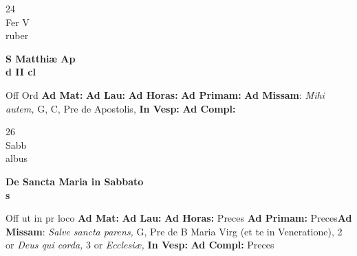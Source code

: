 \documentclass[10pt, openany]{book}
\begin{document}
        \begin{center}
            \begin{minipage}{3.5in}
                \vspace{2em}
                \begin{minipage}{0.5in}
                    {\Huge 24} \\
                    {\normalsize Fer V} \\
                    {\normalsize ruber}
                \end{minipage}
                \begin{minipage}{3.0in}
                    \textbf{ \large S Matthiæ Ap \\
                    \textnormal{\normalsize d II cl}} \\ 
                \end{minipage}
                \begin{justify}Off Ord
                    \textbf{Ad Mat: }
                    \textbf{Ad Lau: }
                    \textbf{Ad Horas: }
                    \textbf{Ad Primam: }\textbf{Ad Missam}: \textit{Mihi autem,} G, C, Pre de Apostolis,  
                    \textbf{In Vesp: }
                    \textbf{Ad Compl: }
                \end{justify}
            \end{minipage}
        \end{center}
    
        \begin{center}
            \begin{minipage}{3.5in}
                \vspace{2em}
                \begin{minipage}{0.5in}
                    {\Huge 26} \\
                    {\normalsize Sabb} \\
                    {\normalsize albus}
                \end{minipage}
                \begin{minipage}{3.0in}
                    \textbf{ \large De Sancta Maria in Sabbato \\
                    \textnormal{\normalsize s}} \\ 
                \end{minipage}
                \begin{justify}Off ut in pr loco
                    \textbf{Ad Mat: }
                    \textbf{Ad Lau: }
                    \textbf{Ad Horas: }Preces
                    \textbf{Ad Primam: }Preces\textbf{Ad Missam}: \textit{Salve sancta parens,} G, Pre de B Maria Virg (et te in Veneratione), 2 or \textit{Deus qui corda,} 3 or \textit{Ecclesiæ,}  
                    \textbf{In Vesp: }
                    \textbf{Ad Compl: }Preces
                \end{justify}
            \end{minipage}
        \end{center}
    
\end{document}
